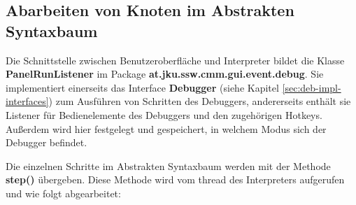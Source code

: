 
\subsection{Abarbeiten von Knoten im Abstrakten Syntaxbaum}
Die Schnittstelle zwischen Benutzeroberfläche und Interpreter bildet die Klasse \textbf{PanelRunListener} im Package \textbf{at.jku.ssw.cmm.gui.event.debug}. Sie implementiert einerseits das Interface \textbf{Debugger} (siehe Kapitel \ref{sec:deb-impl-interfaces}) zum Ausführen von Schritten des Debuggers, andererseits enthält sie Listener für Bedienelemente des Debuggers und den zugehörigen Hotkeys. Außerdem wird hier festgelegt und gespeichert, in welchem Modus sich der Debugger befindet.

Die einzelnen Schritte im Abstrakten Syntaxbaum werden mit der Methode \textbf{step()} übergeben. Diese Methode wird vom thread des Interpreters aufgerufen und wie folgt abgearbeitet:

